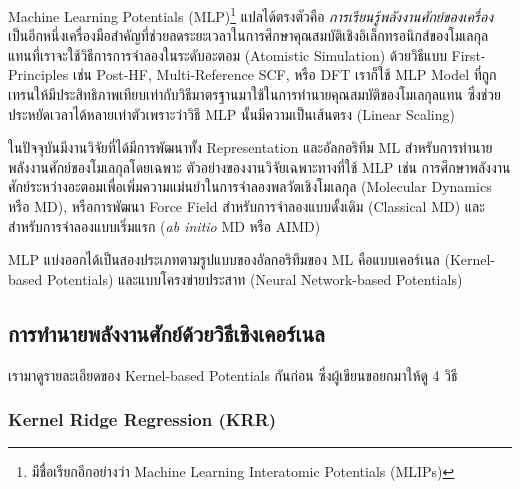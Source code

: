 Machine Learning Potentials (MLP)\footnote{มีชื่อเรียกอีกอย่างว่า Machine Learning Interatomic Potentials (MLIPs)} แปลได้ตรงตัวคือ \textit{การเรียนรู้พลังงานศักย์ของเครื่อง} เป็นอีกหนึ่งเครื่องมือสำคัญที่ช่วยลดระยะเวลาในการศึกษาคุณสมบัติเชิงอิเล็กทรอนิกส์ของโมเลกุล แทนที่เราจะใช้วิธีการการจำลองในระดับอะตอม (Atomistic Simulation) ด้วยวิธีแบบ First-Principles เช่น Post-HF, Multi-Reference SCF, หรือ DFT เราก็ใช้ MLP Model ที่ถูกเทรนให้มีประสิทธิภาพเทียบเท่ากับวิธีมาตรฐานมาใช้ในการทำนายคุณสมบัติของโมเลกุลแทน ซึ่งช่วยประหยัดเวลาได้หลายเท่าตัวเพราะว่าวิธี MLP นั้นมีความเป็นเส้นตรง (Linear Scaling)

ในปัจจุบันมีงานวิจัยที่ได้มีการพัฒนาทั้ง Representation และอัลกอริทึม ML\autocite{behler2016,botu2017,brockherde2017} สำหรับการทำนายพลังงานศักย์ของโมเลกุลโดยเฉพาะ ตัวอย่างของงานวิจัยเฉพาะทางที่ใช้ MLP เช่น การศึกษาพลังงานศักย์ระหว่างอะตอมเพื่อเพิ่มความแม่นยำในการจำลองพลวัตเชิงโมเลกุล (Molecular Dynamics หรือ MD)\autocite{deringer2019,mortazavi2020,zuo2020,dhaliwal2022}, หรือการพัฒนา Force Field สำหรับการจำลองแบบดั้งเดิม (Classical MD)\autocite{noe2020} และสำหรับการจำลองแบบเริ่มแรก (\textit{ab initio} MD หรือ AIMD)\autocite{sivaraman2020,schran2021,li2022}

MLP แบ่งออกได้เป็นสองประเภทตามรูปแบบของอัลกอริทึมของ ML คือแบบเคอร์เนล (Kernel-based Potentials) และแบบโครงข่ายประสาท (Neural Network-based Potentials)

\subsection{การทำนายพลังงานศักย์ด้วยวิธีเชิงเคอร์เนล}
\label{ssec:pred_pot_ener_kernel}

เรามาดูรายละเอียดของ Kernel-based Potentials กันก่อน ซึ่งผู้เขียนขอยกมาให้ดู 4 วิธี

\subsubsection{Kernel Ridge Regression (KRR)} 

